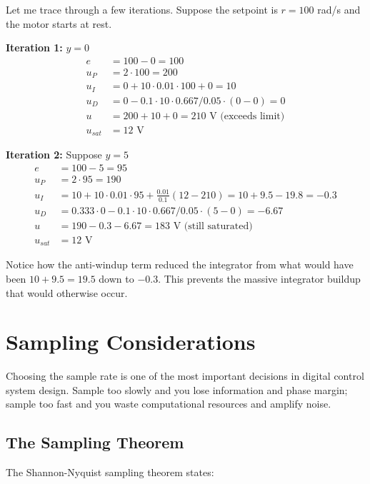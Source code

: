 \begin{example}
Let me trace through a few iterations. Suppose the setpoint is $r = 100$ rad/s and the motor starts at rest.

\textbf{Iteration 1:} $y = 0$
\begin{align}
e &= 100 - 0 = 100 \\
u_P &= 2 \cdot 100 = 200 \\
u_I &= 0 + 10 \cdot 0.01 \cdot 100 + 0 = 10 \\
u_D &= 0 - 0.1 \cdot 10 \cdot 0.667 / 0.05 \cdot (0 - 0) = 0 \\
u &= 200 + 10 + 0 = 210 \text{ V (exceeds limit)}\\
u_{sat} &= 12 \text{ V}
\end{align}

\textbf{Iteration 2:} Suppose $y = 5$
\begin{align}
e &= 100 - 5 = 95 \\
u_P &= 2 \cdot 95 = 190 \\
u_I &= 10 + 10 \cdot 0.01 \cdot 95 + \frac{0.01}{0.1}(12 - 210) = 10 + 9.5 - 19.8 = -0.3 \\
u_D &= 0.333 \cdot 0 - 0.1 \cdot 10 \cdot 0.667 / 0.05 \cdot (5 - 0) = -6.67 \\
u &= 190 - 0.3 - 6.67 = 183 \text{ V (still saturated)}\\
u_{sat} &= 12 \text{ V}
\end{align}

Notice how the anti-windup term reduced the integrator from what would have been $10 + 9.5 = 19.5$ down to $-0.3$. This prevents the massive integrator buildup that would otherwise occur.
\end{example}

\section{Sampling Considerations}
\label{sec:sampling}

Choosing the sample rate is one of the most important decisions in digital control system design. Sample too slowly and you lose information and phase margin; sample too fast and you waste computational resources and amplify noise.

\subsection{The Sampling Theorem}

The Shannon-Nyquist sampling theorem states:

